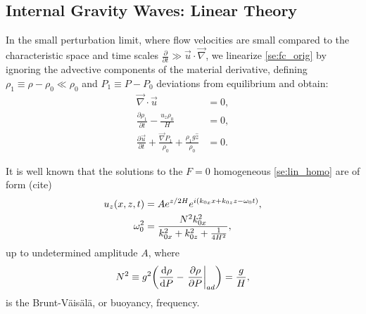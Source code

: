 \documentclass[twocolumn,
        nofootinbib,
        usenames, %
        dvipsnames %
    ]{revtex4-1}%
\newcommand*{\rd}[2]{\frac{\mathrm{d}#1}{\mathrm{d}#2}}
\newcommand*{\pd}[2]{\frac{\partial#1}{\partial#2}}
\newcommand*{\at}[1]{\left.#1\right|}
\DeclarePairedDelimiter\p{\lparen}{\rparen}
\begin{document}
\subsection{Internal Gravity Waves: Linear Theory}

In the small perturbation limit, where flow velocities are small compared to the
characteristic space and time scales $\pd{}{t} \gg \vec{u} \cdot \vec{\nabla}$,
we linearize \autoref{se:fc_orig} by ignoring the advective components of the
material derivative, defining $\rho_1 \equiv \rho - \rho_0 \ll \rho_0$ and $P_1
\equiv P - P_0$ deviations from equilibrium and obtain:
\begin{subequations}\label{se:lin_homo}
    \begin{align}
        \vec{\nabla} \cdot \vec{u} &= 0,\\
        \pd{\rho_1}{t} - \frac{u_{z} \rho_0}{H} &= 0,\\
        \pd{\vec{u}}{t} + \frac{\vec{\nabla}P_1}{\rho_0}
            + \frac{\rho_1 g\hat{z}}{\rho_0}
            &= 0.
    \end{align}
\end{subequations}

It is well known that the solutions to the $F = 0$ homogeneous
\autoref{se:lin_homo} are of form (cite)
\begin{subequations}\label{se:lin_sol}
    \begin{align}
        u_z\p*{x, z, t} &= Ae^{z/2H}e^{i(k_{0x}x + k_{0z}z - \omega_0 t)},\\
        \omega_0^2 &= \frac{N^2k_{0x}^2}{k_{0x}^2 + k_{0z}^2 + \frac{1}{4H^2}},
    \end{align}
\end{subequations}
up to undetermined amplitude $A$, where
\begin{equation}
    N^2 \equiv g^2\p*{\rd{\rho}{P} - \at{\pd{\rho}{P}}_{ad}}
        = \frac{g}{H},
\end{equation}
is the Brunt-V\"ais\"al\"a, or buoyancy, frequency.
\end{document}
